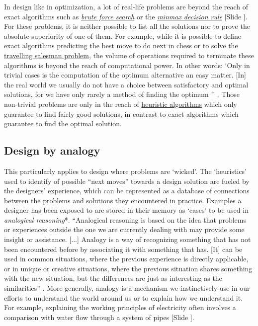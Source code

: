 \documentclass{article}
\newcounter{slide}
\begin{document}
In design like in optimization, a lot of real-life problems are beyond the reach of exact algorithms such as \emph{\href{https://en.wikipedia.org/wiki/Brute-force_search}{brute force search}} or the \emph{\href{https://en.wikipedia.org/wiki/Minimax}{minmax decision rule}} {\color{blue}[Slide ]}. For these problems, it is neither possible to list all the solutions nor to prove the absolute superiority of one of them. For example, while it is possible to define exact algorithms predicting the best move to do next in chess or to solve the \href{https://en.wikipedia.org/wiki/Travelling_salesman_problem}{travelling salesman problem}, the volume of operations required to terminate these algorithms is beyond the reach of computational power. In other words: `Only in trivial cases is the computation of the optimum alternative an easy matter. [In] the real world we usually do not have a choice between satisfactory and optimal solutions, for we have only rarely a method of finding the optimum '' \cite[p. 118-120]{simon1996sciences}. Those non-trivial problems are only in the reach of \href{https://en.wikipedia.org/wiki/Heuristic_(computer_science)}{heuristic algorithms} which only guarantee to find fairly good solutions, in contrast to exact algorithms which guarantee to find the optimal solution. 

\subsection{Design by analogy}
\label{sec:cbr}
This particularly applies to design where problems are `wicked'. The `heuristics' used to identify of possible ``next moves'' towards a design solution are fueled by the designers' experience, which can be represented as a database of connections between the problems and solutions they encountered in practice. Examples a designer has been exposed to are stored in their memory as `cases' to be used in \emph{analogical reasoning}*. ``Analogical reasoning is based on the idea that problems or experiences outside the one we are currently dealing with may provide some insight or assistance. [...] Analogy is a way of recognizing something that has not been encountered before by associating it with something that has. [It] can be used in common situations, where the previous experience is directly applicable, or in unique or creative situations, where the previous situation shares something with the new situation, but the differences are just as interesting as the similarities'' \cite[p. 1]{maher2014case}. More generally, analogy is a mechanism we instinctively use in our efforts to understand the world around us or to explain how we understand it. For example, explaining the working principles of electricity often involves a comparison with water flow through a system of pipes {\color{blue}[Slide ]}. 
\end{document}
